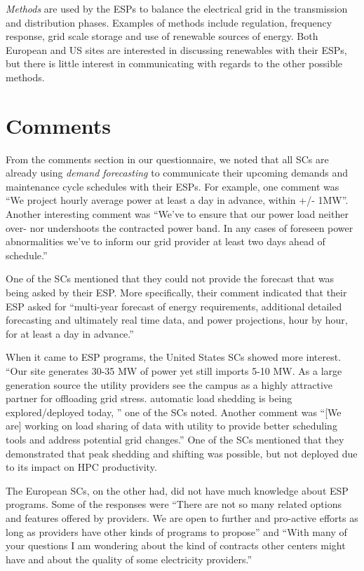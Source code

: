 \documentclass{article}
\begin{document}
\emph{Methods} are used by the ESPs to balance the electrical grid in the transmission and distribution phases. Examples of methods include regulation, frequency response, grid scale storage and use of renewable sources of energy. Both European and US sites are interested in discussing renewables with their ESPs, but there is little interest in communicating with regards to the other possible methods.

\section{Comments}
\label{comm}
From the comments section in our questionnaire, we noted that all SCs are already using \emph{demand forecasting} to communicate their upcoming demands and maintenance cycle schedules with their ESPs. For example, one comment was ``We project hourly average power at least a day in advance, within +/- 1MW''. Another interesting comment was ``We've to ensure that our power load neither over- nor undershoots the contracted power band. In any cases of foreseen power abnormalities we've to inform our grid provider at least two days ahead of schedule.''

One of the SCs mentioned that they could not provide the forecast that was being asked by their ESP. More specifically, their comment indicated that their ESP asked for ``multi-year forecast of energy requirements, additional detailed forecasting and ultimately real time data, and power projections, hour by hour, for at least a day in advance.''

When it came to ESP programs, the United States SCs showed more interest. ``Our site generates 30-35 MW of power yet still imports 5-10 MW. As a large generation source the utility providers see the campus as a highly attractive partner for offloading grid stress. automatic load shedding is being explored/deployed today, '' one of the SCs noted. Another comment was ``[We are] working on load sharing of data with utility to provide better scheduling tools and address potential grid changes.'' One of the SCs mentioned that they demonstrated that peak shedding and shifting was possible, but not deployed due to its impact on HPC productivity. 

The European SCs, on the other had, did not have much knowledge about ESP programs. Some of the responses were ``There are not so many related options and features offered by providers. We are open to further and pro-active efforts as long as providers have other kinds of programs to propose'' and ``With many of your questions I am wondering about the kind of contracts other centers might have and about the quality of some electricity providers.''
\end{document}
